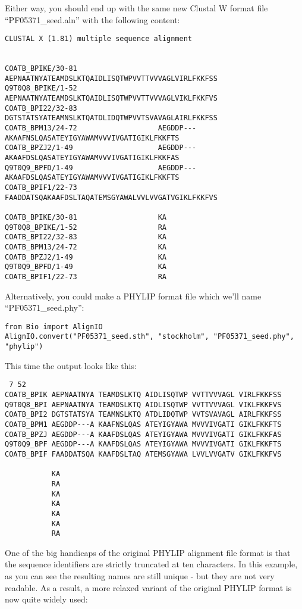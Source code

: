 \documentclass{report}
\begin{document}
Either way, you should end up with the same new Clustal W format file ``PF05371\_seed.aln'' with the following content:

\begin{verbatim}
CLUSTAL X (1.81) multiple sequence alignment


COATB_BPIKE/30-81                   AEPNAATNYATEAMDSLKTQAIDLISQTWPVVTTVVVAGLVIRLFKKFSS
Q9T0Q8_BPIKE/1-52                   AEPNAATNYATEAMDSLKTQAIDLISQTWPVVTTVVVAGLVIKLFKKFVS
COATB_BPI22/32-83                   DGTSTATSYATEAMNSLKTQATDLIDQTWPVVTSVAVAGLAIRLFKKFSS
COATB_BPM13/24-72                   AEGDDP---AKAAFNSLQASATEYIGYAWAMVVVIVGATIGIKLFKKFTS
COATB_BPZJ2/1-49                    AEGDDP---AKAAFDSLQASATEYIGYAWAMVVVIVGATIGIKLFKKFAS
Q9T0Q9_BPFD/1-49                    AEGDDP---AKAAFDSLQASATEYIGYAWAMVVVIVGATIGIKLFKKFTS
COATB_BPIF1/22-73                   FAADDATSQAKAAFDSLTAQATEMSGYAWALVVLVVGATVGIKLFKKFVS

COATB_BPIKE/30-81                   KA
Q9T0Q8_BPIKE/1-52                   RA
COATB_BPI22/32-83                   KA
COATB_BPM13/24-72                   KA
COATB_BPZJ2/1-49                    KA
Q9T0Q9_BPFD/1-49                    KA
COATB_BPIF1/22-73                   RA
\end{verbatim}

Alternatively, you could make a PHYLIP format file which we'll name ``PF05371\_seed.phy'':

\begin{verbatim}
from Bio import AlignIO
AlignIO.convert("PF05371_seed.sth", "stockholm", "PF05371_seed.phy", "phylip")
\end{verbatim}

This time the output looks like this:

\begin{verbatim}
 7 52
COATB_BPIK AEPNAATNYA TEAMDSLKTQ AIDLISQTWP VVTTVVVAGL VIRLFKKFSS
Q9T0Q8_BPI AEPNAATNYA TEAMDSLKTQ AIDLISQTWP VVTTVVVAGL VIKLFKKFVS
COATB_BPI2 DGTSTATSYA TEAMNSLKTQ ATDLIDQTWP VVTSVAVAGL AIRLFKKFSS
COATB_BPM1 AEGDDP---A KAAFNSLQAS ATEYIGYAWA MVVVIVGATI GIKLFKKFTS
COATB_BPZJ AEGDDP---A KAAFDSLQAS ATEYIGYAWA MVVVIVGATI GIKLFKKFAS
Q9T0Q9_BPF AEGDDP---A KAAFDSLQAS ATEYIGYAWA MVVVIVGATI GIKLFKKFTS
COATB_BPIF FAADDATSQA KAAFDSLTAQ ATEMSGYAWA LVVLVVGATV GIKLFKKFVS

           KA
           RA
           KA
           KA
           KA
           KA
           RA
\end{verbatim}

One of the big handicaps of the original PHYLIP alignment file format is
that the sequence identifiers are strictly truncated at ten characters.
In this example, as you can see the resulting names are still unique -
but they are not very readable. As a result, a more relaxed variant of
the original PHYLIP format is now quite widely used:
\end{document}
